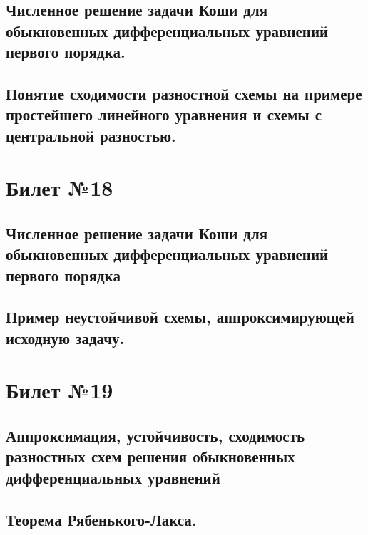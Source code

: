 \documentclass[a4paper]{article}
\begin{document}
\subsection{Численное решение задачи Коши для обыкновенных дифференциальных уравнений первого порядка.}
\subsection{Понятие сходимости разностной схемы на примере простейшего линейного уравнения и схемы с центральной разностью.}

\section{Билет №18}
\subsection{Численное решение задачи Коши для обыкновенных дифференциальных уравнений первого порядка}
\subsection{Пример неустойчивой схемы, аппроксимирующей исходную задачу.}

\section{Билет №19}
\subsection{Аппроксимация, устойчивость, сходимость разностных схем решения обыкновенных дифференциальных уравнений}
\subsection{Теорема Рябенького-Лакса.}
\end{document}
